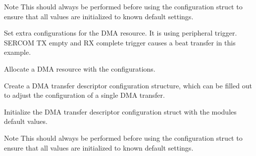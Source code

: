 \begin{DoxyEnumerate}
\begin{DoxyCodeInclude}{0}
\end{DoxyCodeInclude}
 \begin{DoxyNote}{Note}
This should always be performed before using the configuration struct to ensure that all values are initialized to known default settings.
\end{DoxyNote}

\item Set extra configurations for the D\+MA resource. It is using peripheral trigger. S\+E\+R\+C\+OM TX empty and RX complete trigger causes a beat transfer in this example. 
\begin{DoxyCodeInclude}{0}
\end{DoxyCodeInclude}
 
\begin{DoxyCodeInclude}{0}
\end{DoxyCodeInclude}

\item Allocate a D\+MA resource with the configurations. 
\begin{DoxyCodeInclude}{0}
\end{DoxyCodeInclude}
 
\begin{DoxyCodeInclude}{0}
\end{DoxyCodeInclude}

\item Create a D\+MA transfer descriptor configuration structure, which can be filled out to adjust the configuration of a single D\+MA transfer. 
\begin{DoxyCodeInclude}{0}
\end{DoxyCodeInclude}
 
\begin{DoxyCodeInclude}{0}
\end{DoxyCodeInclude}

\item Initialize the D\+MA transfer descriptor configuration struct with the module\textquotesingle{}s default values. 
\begin{DoxyCodeInclude}{0}
\end{DoxyCodeInclude}
 
\begin{DoxyCodeInclude}{0}
\end{DoxyCodeInclude}
 \begin{DoxyNote}{Note}
This should always be performed before using the configuration struct to ensure that all values are initialized to known default settings.
\end{DoxyNote}


\end{DoxyEnumerate}
